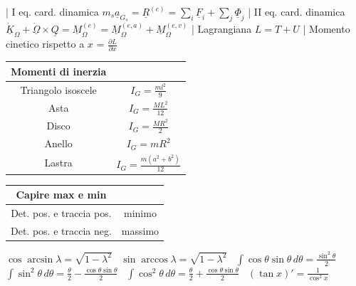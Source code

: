 \documentclass{article}
\begin{document}
| I eq. card. dinamica
$m_{s}\underline{a}_{G_{s}} = \underline{R}^{(e)} = \sum_{i}\underline{F}_{i} + \sum_{j}\underline{\Phi}_{j}$
| II eq. card. dinamica
$\underline{\Dot{K}}_{\Omega} + \underline{\Dot{\Omega}} \times \underline{Q} = \underline{M}_{\Omega}^{(e)} = \underline{M}_{\Omega}^{(e,a)} + \underline{M}_{\Omega}^{(e,v)}$
| Lagrangiana
$L = T + U$
| Momento cinetico rispetto a $x$ =
$\frac{\partial L}{\partial x}$
\begin{table}
\begin{tabular}{|c|c|}
\hline
Momenti di inerzia & \\
\hline
Triangolo isoscele & $I_G = \frac{ml^2}{9}$ \\
Asta & $I_{G} = \frac{ML^{2}}{12}$ \\
Disco & $I_{G} = \frac{MR^2}{2}$ \\
Anello & $I_G = mR^2$ \\
Lastra & $I_G = \frac{m(a^{2} + b^{2})}{12}$ \\
\hline
\end{tabular}
\end{table}
\begin{table}
\begin{tabular}{|c|c|}
\hline
Capire max e min & \\
\hline
Det. pos. e traccia pos. & minimo \\
Det. pos. e traccia neg. & massimo \\
\hline
\end{tabular}
\end{table}
$\cos{\arcsin{\lambda}} = \sqrt{1-\lambda^2}$ \,
$\sin{\arccos{\lambda}} = \sqrt{1-\lambda^2}$ \,
$\int \cos \theta \sin \theta \, d \theta = \frac{\sin^2 \theta}{2}$ \,
$\int \sin^2 \theta \, d \theta = \frac{\theta}{2} - \frac{\cos \theta \sin \theta}{2}$ \,
$\int \cos^2 \theta \, d \theta = \frac{\theta}{2} + \frac{\cos \theta \sin \theta}{2}$ \,
$(\tan x)' = \frac{1}{\cos^2 x}$
\end{document}
